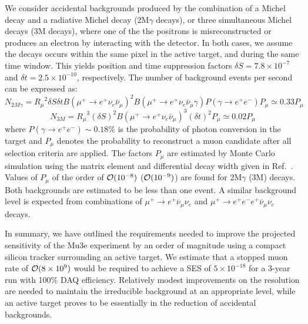 We consider accidental backgrounds produced by the combination of a Michel decay and a radiative Michel decay (2M$\gamma$ decays), or three simultaneous Michel decays (3M decays), where one of the the positrons is misreconstructed or produces an electron by interacting with the detector. In both cases, we assume the decays occurs within the same pixel in the active target, and during the same time window. This yields position and time suppression factors $\delta S = 7.8\times 10^{-7}$ and $\delta t = 2.5\times 10^{-10}$, respectively. The number of background events per second can be expressed as:
%
$$N_{2M\gamma} = {R_\mu}^2 \delta S \delta t {B(\mu^+ \rightarrow e^+ \nu_e \bar\nu_\mu)}^2 B(\mu^+ \rightarrow e^+ \nu_e \bar\nu_\mu \gamma) P(\gamma \rightarrow e^+ e^-)  P_\mu  \simeq 0.33 P_\mu$$
$$N_{3M} = {R_\mu}^3(\delta S)^2 {B(\mu^+ \rightarrow e^+ \nu_e \bar\nu_\mu)}^3 (\delta t)^2 P_\mu \simeq 0.02 P_\mu$$
%
where $P(\gamma \rightarrow e^+ e^-)\sim 0.18\%$ is the probability of photon conversion in the target and $P_\mu$ denotes the probability to reconstruct a muon candidate after all selection criteria are applied. The factors $P_\mu$ are estimated by Monte Carlo simulation using the matrix element and differential decay width given in Ref.~\cite{Kuno:1999jp,Djilkibaev:2008jy}. Values of $P_\mu$ of the order of ${\cal O}(10^{-8})$ (${\cal O}(10^{-9})$) are found for 2M$\gamma$ (3M) decays. Both backgrounds are estimated to be less than one event. A similar background level is expected from combinations of $\mu^+ \rightarrow e^+ \overline{\nu}_{\mu} \nu_e$ and $\mu^+ \rightarrow e^+e^-e^+ \overline{\nu}_{\mu} \nu_e$ decays. 

In summary, we have outlined the requirements needed to improve the projected sensitivity of the Mu3e experiment by an order of magnitude using a compact silicon tracker surrounding an active target. We estimate that a stopped muon rate of ${\cal O}(8\times 10^{9})$ would be required to achieve a SES of $5\times 10^{-18}$ for a 3-year run with 100\% DAQ efficiency. Relatively modest improvements on the resolution are needed to maintain the irreducible background at an appropriate level, while an active target proves to be essentially in the reduction of accidental backgrounds. 


